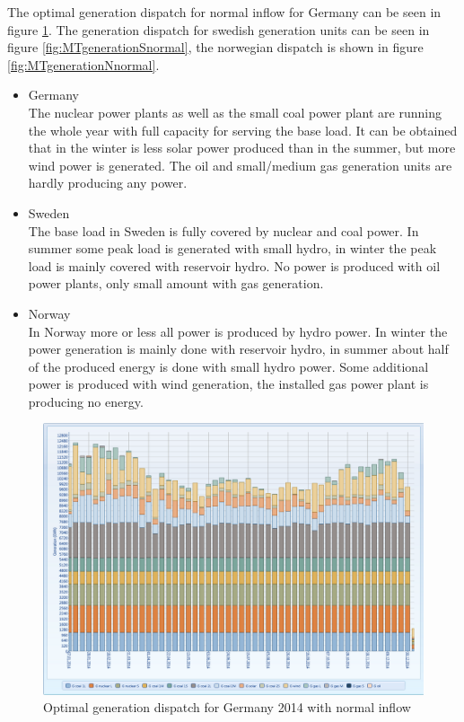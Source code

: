 \documentclass{article}
\begin{document}
The optimal generation dispatch for normal inflow for Germany can be seen in figure \ref{fig:MTgenerationGnormal}. The generation dispatch for swedish generation units can be seen in figure \ref{fig:MTgenerationSnormal}, the norwegian dispatch is shown in figure \ref{fig:MTgenerationNnormal}.
\begin{itemize}
\item Germany\\
The nuclear power plants as well as the small coal power plant are running the whole year with full capacity for serving the base load. It can be obtained that in the winter is less solar power produced than in the summer, but more wind power is generated. The oil and small/medium gas generation units are hardly producing any power.
\item Sweden\\
The base load in Sweden is fully covered by nuclear and coal power. In summer some peak load is generated with small hydro, in winter the peak load is mainly covered with reservoir hydro. No power is produced with oil power plants, only small amount with gas generation.
\item Norway\\
In Norway more or less all power is produced by hydro power. In winter the power generation is mainly done with reservoir hydro, in summer about half of the produced energy is done with small hydro power. Some additional power is produced with wind generation, the installed gas power plant is producing no energy.
\end{itemize}
\begin{figure}[htbp]
\begin{center}
\includegraphics[width=13cm,keepaspectratio=true]{figures/MTgenerationG}
\caption{Optimal generation dispatch for Germany 2014 with normal inflow}
\label{fig:MTgenerationGnormal}
\end{center}
\end{figure}
\end{document}
